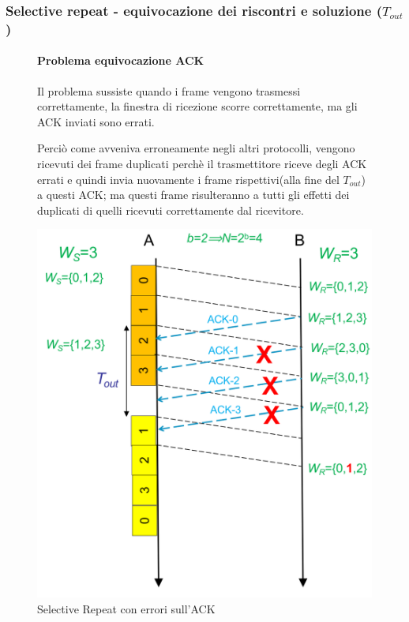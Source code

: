 \newpage

\subsubsection{Selective repeat - equivocazione dei riscontri e soluzione ($T_{out}$)}

\begin{figure}[htbp]
    \centering
    \begin{minipage}{0.48\textwidth}
        \paragraph{Problema equivocazione ACK}
        Il problema sussiste quando i frame vengono trasmessi correttamente, la finestra di ricezione scorre correttamente, ma gli ACK inviati sono errati.

        Perciò come avveniva erroneamente negli altri protocolli, vengono ricevuti dei frame duplicati perchè il trasmettitore riceve degli ACK errati e quindi invia nuovamente i frame rispettivi(alla fine del $T_{out}$) a questi ACK; ma questi frame risulteranno a tutti gli effetti dei duplicati di quelli ricevuti correttamente dal ricevitore.
    \end{minipage}%
    \hfill
    \begin{minipage}{0.45\textwidth}
        \includegraphics[width=\linewidth]{images/srequivocazione.png}
        \caption{Selective Repeat con errori sull'ACK}
    \end{minipage}
\end{figure}

